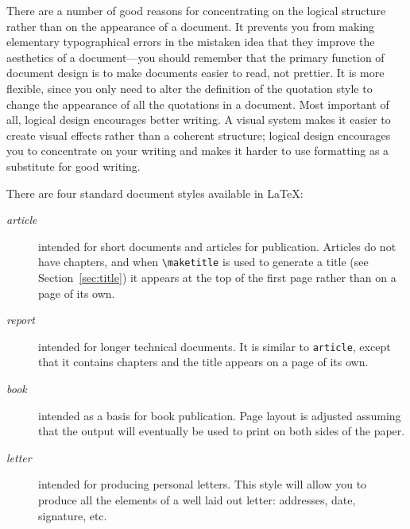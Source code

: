 \documentclass{uicthesi}
\begin{document}
There are a number of good reasons for concentrating on the logical
structure rather than on the appearance of a document.  It prevents
you from making elementary typographical errors in the mistaken
idea that they improve the aesthetics of a document---you should
remember that the primary function of document design is to make
documents easier to read, not prettier.  It is more flexible, since
you only need to alter the definition of the quotation style
to change the appearance of all the quotations in a document.  Most
important of all, logical design encourages better writing.
A visual system makes it easier to create visual effects rather than
a coherent structure; logical design encourages you to concentrate on
your writing and makes it harder to use formatting as a substitute
for good writing.
 
There are four standard document styles available in \LaTeX:
\nobreak
\begin{description}
 
\item[{\em article}] intended for short documents and articles for
publication.
Articles do not have chapters, and when \verb+\maketitle+ is used to
generate a title (see Section~\ref{sec:title}) it appears at the top
of the first page rather than on a page of its own.
 
\item[{\em report}] intended for longer technical documents.
It is similar to {\tt article}, except that
it contains chapters and the title appears on a page of its own.
 
\item[{\em book}] intended as a basis for book publication.
Page layout is
adjusted assuming that the output will eventually be used to print on
both sides of the paper.
 
\item[{\em letter}] intended for producing personal letters.  This style
will allow you to produce all the elements of a well laid out letter:
addresses, date, signature, etc.
\end{description}
 
\end{document}
